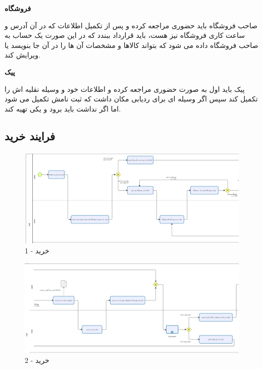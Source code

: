 \documentclass[12pt,a4paper]{article}
\begin{document}
		
		
		\textbf{فروشگاه}
		
		
		صاحب فروشگاه باید حضوری مراجعه کرده و پس از تکمیل اطلاعات که در آن آدرس و ساعت کاری فروشگاه نیز هست، باید قرارداد ببندد که در این صورت یک حساب به صاحب فروشگاه داده می شود که بتواند کالاها و مشخصات آن ها را در آن جا بنویسد یا ویرایش کند.
		
		\textbf{پیک}
		
		
		پیک باید اول به صورت حضوری مراجعه کرده و اطلاعات خود و وسیله نقلیه اش را تکمیل کند سپس اگر وسیله ای برای ردیابی مکان داشت که ثبت نامش تکمیل می شود اما اگر نداشت باید برود و یکی تهیه کند.
		\pagebreak
	
	\subsection{فرایند خرید} \label{section.function.buy}
		\begin{figure}[h!]
			\begin{center}
				\includegraphics[width=14cm]{images/Bizagi Buy 1.png}	
			\end{center}
			\caption{خرید - 1}
		\end{figure}
		\begin{figure}[h!]
			\begin{center}
				\includegraphics[width=14cm]{images/Bizagi Buy 2.png}	
			\end{center}
			\caption{خرید - 2}
		\end{figure}
\end{document}
